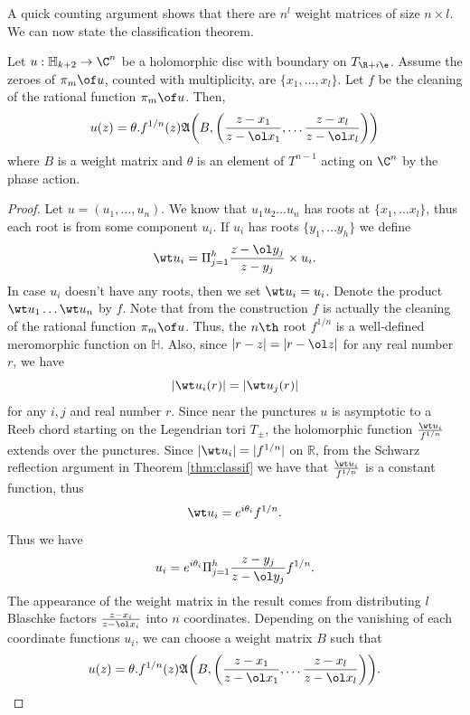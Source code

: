 \noindent A quick counting argument shows that  there are $n^l$ weight matrices of size $n\times l$. We can now state the classification theorem.

\begin{Theorem}\label{thm:classifboundarypunct}
    Let $u:\mathbb H_{k+2} \to \C^n$ be a holomorphic disc with boundary on $T_{\R + i\e}$. Assume the zeroes of $\pi_m \of u$, counted with multiplicity, are $\{x_1,\dots, x_l\}$. Let $f$ be the cleaning of the rational function $\pi_m \of u$. Then,  $$u(z) = \theta . f^{1/n} (z) \mathfrak{A} \bigg( B, \bigg( \frac{z-x_1}{z-\ol x_1},  \dots \frac{z-x_l}{z-\ol x_l} \bigg ) \bigg) $$ where $B$ is a weight matrix and $\theta$ is an element of $T^{n-1}$ acting on $\C^n$ by the phase action.
\end{Theorem}
\begin{proof}
    Let $u=( u_1, \dots,  u_n )$. We know that $u_1u_2\dots u_n$ has roots at $\{ x_1 , \dots x_l \}$, thus each root is  from some component $u_i$. If $u_i$ has roots $\{y_1,\dots y_h\}$ we define $$\wt u_i = \Pi_{j=1}^h \frac{z-\ol y_j}{z-y_j} \times u_i.$$In case $u_i$ doesn't have any roots, then we set $\wt u_i = u_i$. Denote the product $\wt u_1 \dots \wt u_n$ by $f$. Note that from the construction $f$ is actually the cleaning of the rational function $\pi_m \of u$. Thus, the $n\th$ root $f^{1/n}$ is a well-defined meromorphic function on $\mathbb H$.
    Also, since $|r-z| = |r-\ol z | $ for any real number $r$, we have  $$|\wt u_i(r)| =|\wt u_j(r)| $$ for any $i,j$ and real number $r$. Since near the punctures $u$ is asymptotic to a Reeb chord starting on the Legendrian tori $T_\pm$, the holomorphic function  $\frac{\wt u_i}{f^{1/n}}$ extends over the punctures. Since $|\wt u_i| = |f^{1/n}|$ on $\mathbb R$, from the Schwarz reflection argument in Theorem \ref{thm:classif} we have that $\frac{\wt u_i}{f^{1/n}}$ is a constant function, thus $$\wt u_i = e^{i\theta_i}f^{1/n}.$$
    Thus we have $$u_i = e^{i\theta_i}\Pi_{j=1}^h \frac{z- y_j}{z-\ol y_j} f^{1/n}.$$
    The appearance of the weight matrix in the result comes from distributing $l$ Blaschke factors $\frac{z-x_i}{z-\ol x_i}$ into $n$ coordinates. Depending on the vanishing of each coordinate functions $u_i$, we can choose a weight matrix $B$ such that 
    $$u(z) = \theta . f^{1/n} (z) \mathfrak{A} \bigg( B, \bigg( \frac{z-x_1}{z-\ol x_1},  \dots \frac{z-x_l}{z-\ol x_l} \bigg ) \bigg) .$$
   
\end{proof}


